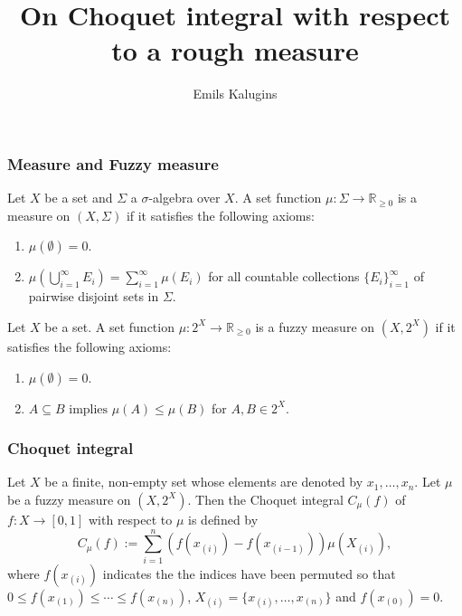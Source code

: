 \documentclass[envcountsect]{beamer}
\title{On Choquet integral with respect to a rough measure}
\author{Emils Kalugins}
\begin{document}
\begin{frame}
	\maketitle
\end{frame}
\begin{frame}
\frametitle{Measure and Fuzzy measure}

	\begin{definition}
		Let $X$ be a set and $\Sigma$ a $\sigma$-algebra over $X$. A set function $\mu : \Sigma \rightarrow \mathbb{R}_{\geq 0}$ is a measure on $(X,\Sigma)$ if it satisfies the following axioms:
		\begin{enumerate}
			\item $\mu(\emptyset) = 0.$ \\
			\item $\mu\left(\bigcup\limits_{i=1}^\infty E_i \right) = \sum\limits_{i=1}^\infty \mu(E_i)$ for all countable collections $\{E_i\}_{i=1}^\infty$ of pairwise disjoint sets in $\Sigma.$		
		\end{enumerate}


	\end{definition}

\begin{definition}

	Let $X$ be a set. A set function $\mu:2^{X} \rightarrow \mathbb{R}_{\geq 0}$ is a fuzzy measure on $(X, 2^X)$ if it satisfies the following axioms:

\begin{enumerate}
\item $\mu(\emptyset) =0.$ \\
\item $A \subseteq B \text{ implies } \mu(A) \leq \mu(B)$ for $A,B \in 2^X$.
\end{enumerate}

\end{definition}

\end{frame}

\begin{frame}
\frametitle{Choquet integral}

\begin{definition}
Let $X$ be a finite, non-empty set whose elements are denoted by $x_1,\dots,x_n$. 
Let $\mu$ be a fuzzy measure on $(X,2^X)$. Then the Choquet integral $C_{\mu}(f)$ of $f: X \rightarrow [0,1]$ with respect to $\mu$ is defined by
$$
C_{\mu}(f) := \sum_{i=1}^n (f(x_{(i)}) - f(x_{(i-1)}))\mu(X_{(i)}),
$$
where $ f(x_{(i)})$ indicates the the indices have been permuted so that
$ 0 \leq f(x_{(1)}) \leq \cdots \leq f(x_{(n)})$, $X_{(i)} = \{x_{(i)}, \dots ,x_{(n)}\}$ and $f(x_{(0)})=0.$
\end{definition}

\end{frame}
\end{document}

